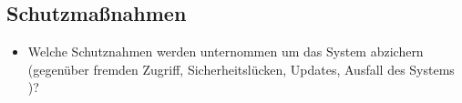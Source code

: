 \subsection{Schutzmaßnahmen}
\label{sec:Schutzmaßnahmen}
\begin{itemize}
	\item Welche Schutznahmen werden unternommen um das System abzichern (\zB gegenüber fremden Zugriff, Sicherheitslücken, Updates, Ausfall des Systems \etc)?
\end{itemize}



